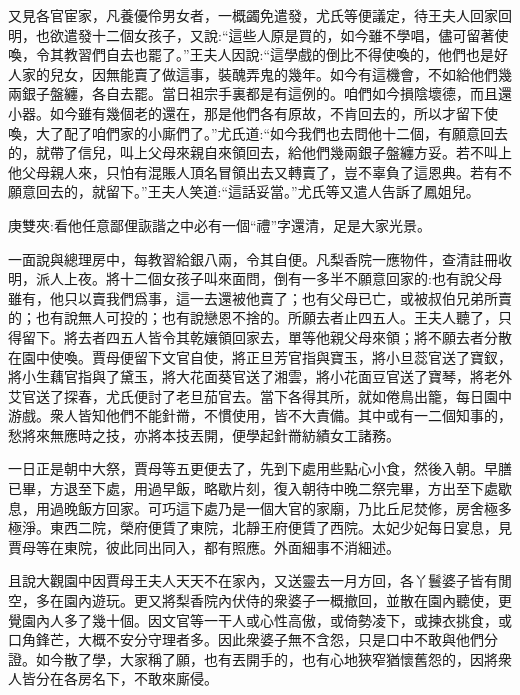 \begin{parag}
    又見各官宦家，凡養優伶男女者，一概蠲免遣發，尤氏等便議定，待王夫人回家回明，也欲遣發十二個女孩子，又說:“這些人原是買的，如今雖不學唱，儘可留著使喚，令其教習們自去也罷了。”王夫人因說:“這學戲的倒比不得使喚的，他們也是好人家的兒女，因無能賣了做這事，裝醜弄鬼的幾年。如今有這機會，不如給他們幾兩銀子盤纏，各自去罷。當日祖宗手裏都是有這例的。咱們如今損陰壞德，而且還小器。如今雖有幾個老的還在，那是他們各有原故，不肯回去的，所以才留下使喚，大了配了咱們家的小廝們了。”尤氏道:“如今我們也去問他十二個，有願意回去的，就帶了信兒，叫上父母來親自來領回去，給他們幾兩銀子盤纏方妥。若不叫上他父母親人來，只怕有混賬人頂名冒領出去又轉賣了，豈不辜負了這恩典。若有不願意回去的，就留下。”王夫人笑道:“這話妥當。”尤氏等又遣人告訴了鳳姐兒。\begin{note}庚雙夾:看他任意鄙俚詼諧之中必有一個“禮”字還清，足是大家光景。\end{note}一面說與總理房中，每教習給銀八兩，令其自便。凡梨香院一應物件，查清註冊收明，派人上夜。將十二個女孩子叫來面問，倒有一多半不願意回家的:也有說父母雖有，他只以賣我們爲事，這一去還被他賣了；也有父母已亡，或被叔伯兄弟所賣的；也有說無人可投的；也有說戀恩不捨的。所願去者止四五人。王夫人聽了，只得留下。將去者四五人皆令其乾孃領回家去，單等他親父母來領；將不願去者分散在園中使喚。賈母便留下文官自使，將正旦芳官指與寶玉，將小旦蕊官送了寶釵，將小生藕官指與了黛玉，將大花面葵官送了湘雲，將小花面豆官送了寶琴，將老外艾官送了探春，尤氏便討了老旦茄官去。當下各得其所，就如倦鳥出籠，每日園中游戲。衆人皆知他們不能針黹，不慣使用，皆不大責備。其中或有一二個知事的，愁將來無應時之技，亦將本技丟開，便學起針黹紡績女工諸務。
\end{parag}


\begin{parag}
    一日正是朝中大祭，賈母等五更便去了，先到下處用些點心小食，然後入朝。早膳已畢，方退至下處，用過早飯，略歇片刻，復入朝待中晚二祭完畢，方出至下處歇息，用過晚飯方回家。可巧這下處乃是一個大官的家廟，乃比丘尼焚修，房舍極多極淨。東西二院，榮府便賃了東院，北靜王府便賃了西院。太妃少妃每日宴息，見賈母等在東院，彼此同出同入，都有照應。外面細事不消細述。
\end{parag}


\begin{parag}
    且說大觀園中因賈母王夫人天天不在家內，又送靈去一月方回，各丫鬟婆子皆有閒空，多在園內遊玩。更又將梨香院內伏侍的衆婆子一概撤回，並散在園內聽使，更覺園內人多了幾十個。因文官等一干人或心性高傲，或倚勢凌下，或揀衣挑食，或口角鋒芒，大概不安分守理者多。因此衆婆子無不含怨，只是口中不敢與他們分證。如今散了學，大家稱了願，也有丟開手的，也有心地狹窄猶懷舊怨的，因將衆人皆分在各房名下，不敢來廝侵。
\end{parag}


